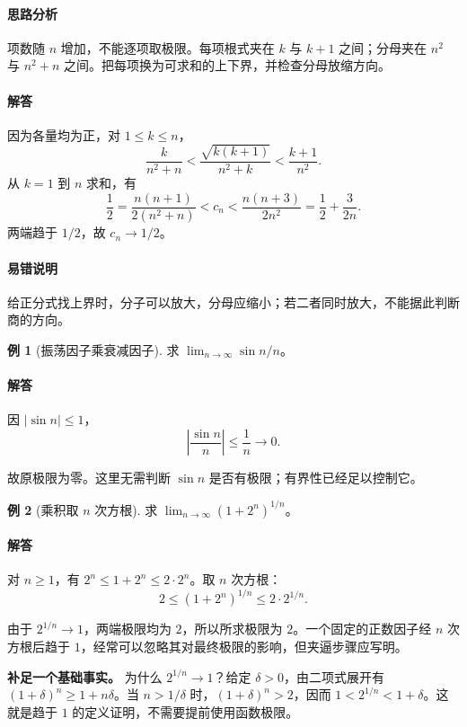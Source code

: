 \documentclass[UTF8,fontset=fandol,12pt,oneside,openany]{ctexrep}
\theoremstyle{definition}
\newtheorem{example}{例}[chapter]
\begin{document}
\paragraph{思路分析} 项数随 $n$ 增加，不能逐项取极限。每项根式夹在 $k$ 与 $k+1$ 之间；分母夹在 $n^2$ 与 $n^2+n$ 之间。把每项换为可求和的上下界，并检查分母放缩方向。
\paragraph{解答} 因为各量均为正，对 $1\le k\le n$，
\[
\frac{k}{n^2+n}
<\frac{\sqrt{k(k+1)}}{n^2+k}
<\frac{k+1}{n^2}.
\]
从 $k=1$ 到 $n$ 求和，有
\[
\frac12=\frac{n(n+1)}{2(n^2+n)}
<c_n<\frac{n(n+3)}{2n^2}=\frac12+\frac{3}{2n}.
\]
两端趋于 $1/2$，故 $c_n\to1/2$。
\paragraph{易错说明} 给正分式找上界时，分子可以放大，分母应缩小；若二者同时放大，不能据此判断商的方向。

\begin{example}[振荡因子乘衰减因子]
求 $\lim_{n\to\infty}\sin n/n$。
\end{example}

\paragraph{解答} 因 $|\sin n|\le1$，
\[
\left|\frac{\sin n}{n}\right|\le\frac1n\to0.
\]

故原极限为零。这里无需判断 $\sin n$ 是否有极限；有界性已经足以控制它。

\begin{example}[乘积取 $n$ 次方根]
求 $\lim_{n\to\infty}(1+2^n)^{1/n}$。
\end{example}

\paragraph{解答} 对 $n\ge1$，有 $2^n\le1+2^n\le2\cdot2^n$。取 $n$ 次方根：
\[
2\le(1+2^n)^{1/n}\le2\cdot2^{1/n}.
\]

由于 $2^{1/n}\to1$，两端极限均为 $2$，所以所求极限为 $2$。一个固定的正数因子经 $n$ 次方根后趋于 $1$，经常可以忽略其对最终极限的影响，但夹逼步骤应写明。

\textbf{补足一个基础事实。} 为什么 $2^{1/n}\to1$？给定 $\delta>0$，由二项式展开有 $(1+\delta)^n\ge1+n\delta$。当 $n>1/\delta$ 时，$(1+\delta)^n>2$，因而 $1<2^{1/n}<1+\delta$。这就是趋于 $1$ 的定义证明，不需要提前使用函数极限。
\end{document}
